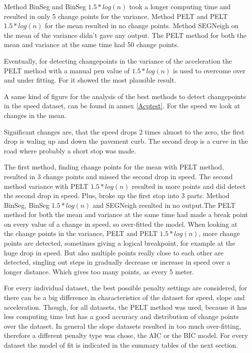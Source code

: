 Method BinSeg and BinSeg $1.5*log(n)$ took a longer computing time and resulted in only 5 change points for the variance. Method PELT and PELT $1.5*log(n)$  for the mean resulted in no change points. Method SEGNeigh on the mean of the variance didn't gave any output. The PELT method for both the mean and variance at the same time had 50 change points.  


Eventually, for detecting changepoints in the variance of the acceleration the PELT method with a manual pen value of $1.5 * log(n)$ is used to overcome over and under fitting. For it showed the most plausible result.

A same kind of figure for the analysis of the best methods to detect changepoints in the speed dataset, can be found in annex \ref{Acptest}.
For the speed we look at changes in the mean.

Significant changes are, that the speed drops 2 times almost to the zero, the first drop is waling up and down the pavement curb. The second drop is a curve in the road where probably a short stop was made.

The first method, finding change points for the mean with PELT method, resulted in 3 change points and missed the second drop in speed.  The second method variance with PELT $1.5*log(n)$ resulted in more points and did detect the second drop in speed. Plus, broke up the first stop into 3 parts. Method BinSeg, BinSeg $1.5*log(n)$ and SEGNeigh resulted in no output.The PELT method for both the mean and variance at the same time had made a break point on every value of a change in speed, so over-fitted the model. 
When looking at the change points in the variance, PELT and PELT $1.5*log(n)$, more change points are detected, sometimes giving a logical breakpoint, for example at the huge drop in speed. But also multiple points really close to each other are detected, singling out steps in gradually decrease or increase in speed over a longer distance. Which gives too many points, as every 5 meter. 


For every individual dataset, the best possible penalty settings are considered, for there can be a big difference in characteristics of the dataset for speed, slope and acceleration. Though, for all datasets, the PELT method was used, because it has less computing time but has a good accuracy and distribution of change points over the dataset. In general the slope datasets resulted in too much over-fitting, therefore a different penalty type was chose, the AIC or the BIC model. For every dataset the model of fit is indicated in the summary tables of the next section.  





